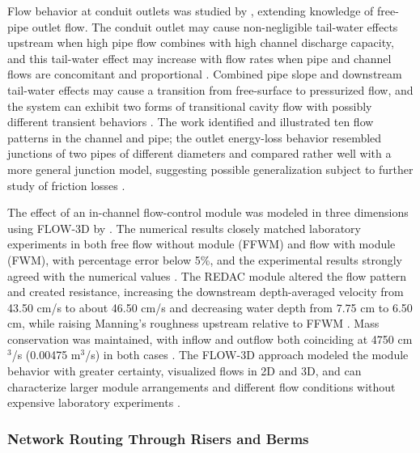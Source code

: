 Flow behavior at conduit outlets was studied by \textcite{Nédélec2008}, extending
knowledge of free-pipe outlet flow. The conduit outlet may cause non-negligible tail-water
effects upstream when high pipe flow combines with high channel discharge capacity, and
this tail-water effect may increase with flow rates when pipe and channel flows are
concomitant and proportional \parencite{Nédélec2008}. Combined pipe slope and downstream
tail-water effects may cause a transition from free-surface to pressurized flow, and the
system can exhibit two forms of transitional cavity flow with possibly different transient
behaviors \parencite{Nédélec2008}. The work identified and illustrated ten flow patterns
in the channel and pipe; the outlet energy-loss behavior resembled junctions of two pipes
of different diameters and compared rather well with a more general junction model,
suggesting possible generalization subject to further study of friction losses
\parencite{Nédélec2008}.

The effect of an in-channel flow-control module was modeled in three dimensions using
FLOW-3D by \textcite{Abdurrasheed2019}. The numerical results closely matched laboratory
experiments in both free flow without module (FFWM) and flow with module (FWM), with
percentage error below 5\%, and the experimental results strongly agreed with the numerical
values \parencite{Abdurrasheed2019}. The REDAC module altered the flow pattern and created
resistance, increasing the downstream depth-averaged velocity from 43.50 cm/s to about
46.50 cm/s and decreasing water depth from 7.75 cm to 6.50 cm, while raising Manning's
roughness upstream relative to FFWM \parencite{Abdurrasheed2019}. Mass conservation was
maintained, with inflow and outflow both coinciding at 4750 cm$^3$/s (0.00475 m$^3$/s) in
both cases \parencite{Abdurrasheed2019}. The FLOW-3D approach modeled the module behavior
with greater certainty, visualized flows in 2D and 3D, and can characterize larger module
arrangements and different flow conditions without expensive laboratory experiments
\parencite{Abdurrasheed2019}.

\subsubsection{Network Routing Through Risers and Berms}

